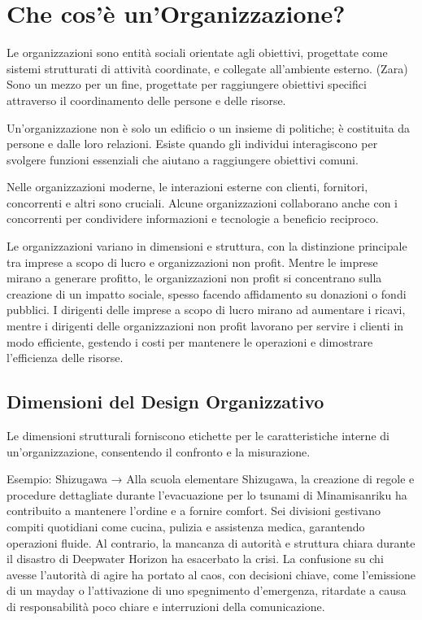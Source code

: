 \documentclass{article}
\begin{document}
    \tableofcontents
    \newpage
    
    \section{Che cos'è un'Organizzazione?}

    Le organizzazioni sono entità sociali orientate agli obiettivi, progettate come sistemi strutturati di attività coordinate, e collegate all'ambiente esterno. (Zara) Sono un mezzo per un fine, progettate per raggiungere obiettivi specifici attraverso il coordinamento delle persone e delle risorse.
    
    Un'organizzazione non è solo un edificio o un insieme di politiche; è costituita da persone e dalle loro relazioni. Esiste quando gli individui interagiscono per svolgere funzioni essenziali che aiutano a raggiungere obiettivi comuni.
    
    Nelle organizzazioni moderne, le interazioni esterne con clienti, fornitori, concorrenti e altri sono cruciali. Alcune organizzazioni collaborano anche con i concorrenti per condividere informazioni e tecnologie a beneficio reciproco.
    
    Le organizzazioni variano in dimensioni e struttura, con la distinzione principale tra imprese a scopo di lucro e organizzazioni non profit. Mentre le imprese mirano a generare profitto, le organizzazioni non profit si concentrano sulla creazione di un impatto sociale, spesso facendo affidamento su donazioni o fondi pubblici. I dirigenti delle imprese a scopo di lucro mirano ad aumentare i ricavi, mentre i dirigenti delle organizzazioni non profit lavorano per servire i clienti in modo efficiente, gestendo i costi per mantenere le operazioni e dimostrare l'efficienza delle risorse.
    
    \subsection{Dimensioni del Design Organizzativo}
    
    Le dimensioni strutturali forniscono etichette per le caratteristiche interne di un'organizzazione, consentendo il confronto e la misurazione.
    
    Esempio: Shizugawa → Alla scuola elementare Shizugawa, la creazione di regole e procedure dettagliate durante l'evacuazione per lo tsunami di Minamisanriku ha contribuito a mantenere l'ordine e a fornire comfort. Sei divisioni gestivano compiti quotidiani come cucina, pulizia e assistenza medica, garantendo operazioni fluide. Al contrario, la mancanza di autorità e struttura chiara durante il disastro di Deepwater Horizon ha esacerbato la crisi. La confusione su chi avesse l'autorità di agire ha portato al caos, con decisioni chiave, come l'emissione di un mayday o l'attivazione di uno spegnimento d'emergenza, ritardate a causa di responsabilità poco chiare e interruzioni della comunicazione.
    
\end{document}
